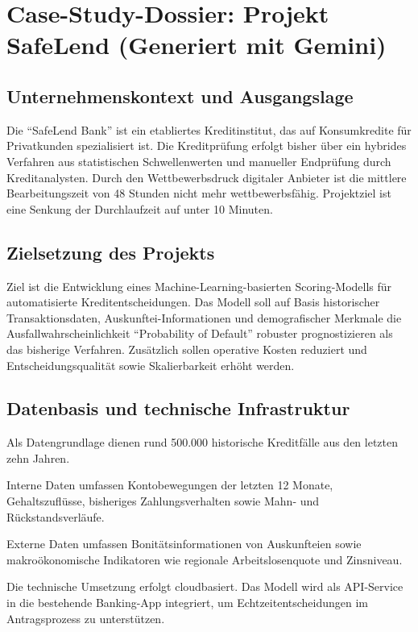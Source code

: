 \section{Case-Study-Dossier: Projekt SafeLend (Generiert mit Gemini)}

\subsection{Unternehmenskontext und Ausgangslage}
Die \enquote{SafeLend Bank} ist ein etabliertes Kreditinstitut,
das auf Konsumkredite für Privatkunden spezialisiert ist.
Die Kreditprüfung erfolgt bisher über ein hybrides Verfahren
aus statistischen Schwellenwerten und manueller Endprüfung
durch Kreditanalysten.
Durch den Wettbewerbsdruck digitaler Anbieter ist die mittlere
Bearbeitungszeit von 48 Stunden nicht mehr wettbewerbsfähig.
Projektziel ist eine Senkung der Durchlaufzeit auf unter 10 Minuten.

\subsection{Zielsetzung des Projekts}
Ziel ist die Entwicklung eines Machine-Learning-basierten
Scoring-Modells für automatisierte Kreditentscheidungen.
Das Modell soll auf Basis historischer Transaktionsdaten,
Auskunftei-Informationen und demografischer Merkmale
die Ausfallwahrscheinlichkeit
\enquote{Probability of Default} robuster prognostizieren
als das bisherige Verfahren.
Zusätzlich sollen operative Kosten reduziert
und Entscheidungsqualität sowie Skalierbarkeit erhöht werden.

\subsection{Datenbasis und technische Infrastruktur}
Als Datengrundlage dienen rund 500.000 historische Kreditfälle
aus den letzten zehn Jahren.

Interne Daten umfassen Kontobewegungen der letzten 12 Monate,
Gehaltszuflüsse, bisheriges Zahlungsverhalten
sowie Mahn- und Rückstandsverläufe.

Externe Daten umfassen Bonitätsinformationen von Auskunfteien
sowie makroökonomische Indikatoren
wie regionale Arbeitslosenquote und Zinsniveau.

Die technische Umsetzung erfolgt cloudbasiert.
Das Modell wird als API-Service in die bestehende Banking-App integriert,
um Echtzeitentscheidungen im Antragsprozess zu unterstützen.

